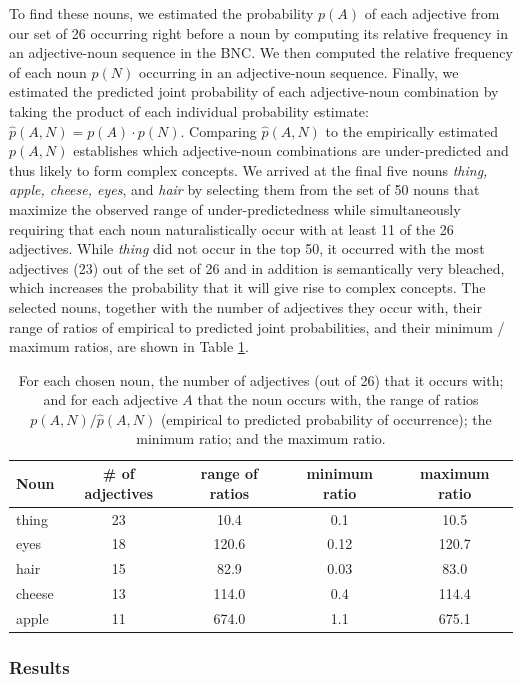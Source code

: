\documentclass[12pt]{article}
\begin{document}
To find these nouns, we estimated the probability $p(A)$ of each adjective from our set of 26 occurring right before a noun by computing its relative frequency in an adjective-noun sequence in the BNC. We then computed the relative frequency of each noun $p(N)$ occurring in an adjective-noun sequence. Finally, we estimated the predicted joint probability of each adjective-noun combination by taking the product of each individual probability estimate: $\hat{p}(A,N) = p(A)\cdot p(N)$. Comparing  $\hat{p}(A,N)$ to the empirically estimated $p(A,N)$ establishes which adjective-noun combinations are under-predicted and thus likely to form complex concepts. We arrived at the final five nouns \emph{thing, apple, cheese, eyes}, and \emph{hair} by selecting them from the set of 50 nouns that maximize the observed range of under-predictedness while simultaneously requiring that each noun naturalistically occur with at least 11 of the 26 adjectives. While \emph{thing} did not occur in the top 50, it occurred with the most adjectives (23) out of the set of 26 and in addition is semantically very bleached, which increases the probability that it will give rise to complex concepts. The selected nouns, together with the number of adjectives they occur with, their range of ratios of empirical to predicted joint probabilities, and their minimum / maximum ratios, are shown in Table \ref{tab:nouns}.

\begin{table}
\centering
\begin{tabular}{l c c c c}
\toprule
Noun & \# of adjectives & range of ratios & minimum ratio & maximum ratio\\
\midrule
thing & 23 & 10.4 & 0.1 & 10.5 \\
eyes & 18 & 120.6 & 0.12 & 120.7 \\
hair & 15 & 82.9 & 0.03 & 83.0 \\
cheese & 13 & 114.0 & 0.4 & 114.4 \\
apple & 11 & 674.0 & 1.1 & 675.1 \\
\bottomrule
\end{tabular}
\caption{For each chosen noun, the number of adjectives (out of 26) that it occurs with; and for each adjective $A$ that the noun occurs with, the range of ratios $p(A,N) / \hat{p}(A,N)$ (empirical to predicted probability of occurrence); the minimum ratio; and the maximum ratio.}
\label{tab:nouns}
\end{table}




\subsubsection{Results}
\end{document}

